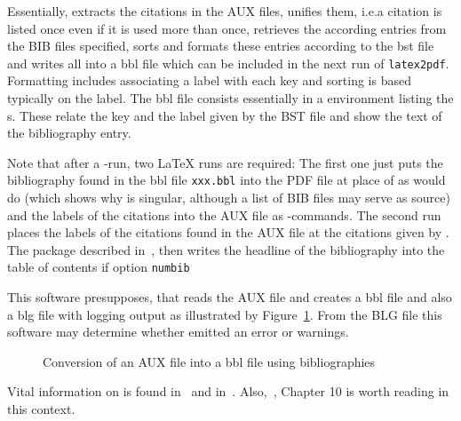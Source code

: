Essentially,  extracts the citations in the AUX files, 
unifies them, i.e.\@ a citation is listed once even if it is used more than once, 
retrieves the according entries from the BIB files specified, 
sorts and formats these entries 
according to the \gls{bst} file and writes all into a \gls{bbl} file 
which can be included in the next run of \texttt{latex2pdf}. 
Formatting includes associating a label with each key 
and sorting is based typically on the label. 
The \gls{bbl} file consists essentially in a  environment 
listing the s. 
These relate the key and the label given by the BST file 
and show the text of the bibliography entry. 

Note that after a -run, 
two \LaTeX{} runs are required: 
The first one just puts the bibliography found in the \gls{bbl} file \texttt{xxx.bbl}
into the PDF file at place of  as  would do 
(which shows why  is singular, although a list of BIB files may serve as source)
and the labels of the citations into the AUX file 
as -commands. 
The second run places the labels of the citations found in the AUX file 
at the citations given by . 
The package  described in~\cite{TocBibIndP}, 
then writes the headline of the bibliography 
into the table of contents 
if option \texttt{numbib}



This software presupposes, that  reads the AUX file 
and creates a \gls{bbl} file and also a \gls{blg} file with logging output 
as illustrated by Figure~\ref{fig:aux2bbl}. 
From the BLG file this software may determine 
whether  emitted an error or warnings. 


\begin{figure}[htb]
\centering
{}
\caption{\label{fig:aux2bbl}
Conversion of an AUX file into a \gls{bbl} file using bibliographies}
\end{figure}

Vital information on  is found in~\cite{BibPat} 
and in~\cite{BibMar}. 
Also,~\cite{Gra}, Chapter 10 is worth reading in this context. 

